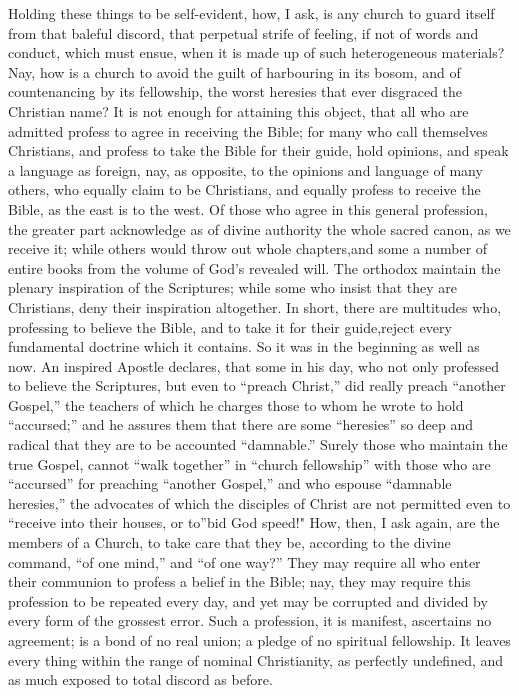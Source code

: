 \documentclass[
]{book}
\begin{document}
Holding these things to be self-evident, how, I ask, is any church to guard itself from that baleful discord, that perpetual strife of feeling, if not of words and conduct, which must ensue, when it is made up of such heterogeneous materials? Nay, how is a church to avoid the guilt of harbouring in its bosom, and of countenancing by its fellowship, the worst heresies that ever disgraced the Christian name? It is not enough for attaining this object, that all who are admitted profess to agree in receiving the Bible; for many who call themselves Christians, and profess to take the Bible for their guide, hold opinions, and speak a language as foreign, nay, as opposite, to the opinions and language of many others, who equally claim to be Christians, and equally profess to receive the Bible, as the east is to the west. Of those who agree in this general profession, the greater part acknowledge as of divine authority the whole sacred canon, as we receive it; while others would throw out whole chapters,and some a number of entire books from the volume of God's revealed will. The orthodox maintain the plenary inspiration of the Scriptures; while some who insist that they are Christians, deny their inspiration altogether. In short, there are multitudes who, professing to believe the Bible, and to take it for their guide,reject every fundamental doctrine which it contains. So it was in the beginning as well as now. An inspired Apostle declares, that some in his day, who not only professed to believe the Scriptures, but even to ``preach Christ,'' did really preach ``another Gospel,'' the teachers of which he charges those to whom he wrote to hold ``accursed;'' and he assures them that there are some ``heresies'' so deep and radical that they are to be accounted ``damnable.'' Surely those who maintain the true Gospel, cannot ``walk together'' in ``church fellowship'' with those who are ``accursed'' for preaching ``another Gospel,'' and who espouse ``damnable heresies,'' the advocates of which the disciples of Christ are not permitted even to ``receive into their houses, or to''bid God speed!" How, then, I ask again, are the members of a Church, to take care that they be, according to the divine command, ``of one mind,'' and ``of one way?'' They may require all who enter their communion to profess a belief in the Bible; nay, they may require this profession to be repeated every day, and yet may be corrupted and divided by every form of the grossest error. Such a profession, it is manifest, ascertains no agreement; is a bond of no real union; a pledge of no spiritual fellowship. It leaves every thing within the range of nominal Christianity, as perfectly undefined, and as much exposed to total discord as before.
\end{document}
